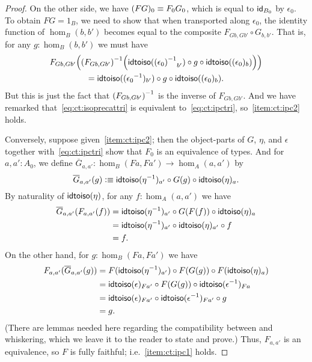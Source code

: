 \begin{proof}
  On the other side, we have $(FG)_0\jdeq F_0 G_0$, which is equal to $\idfunc[B_0]$ by $\epsilon_0$.
  To obtain $FG=1_B$, we need to show that when transported along $\epsilon_0$, the identity function of $\hom_B(b,b')$ becomes equal to the composite $F_{Gb,Gb'} \circ G_{b,b'}$.
  That is, for any $g:\hom_B(b,b')$ we must have
  \begin{multline*}
    F_{Gb,Gb'}\Big(\inv{(F_{Gb,Gb'})}\Big(\idtoiso(\opp{(\epsilon_0)}_{b'}) \circ g \circ \idtoiso((\epsilon_0)_b)\Big)\Big)\\
    = \idtoiso((\opp{\epsilon_0})_{b'}) \circ g \circ \idtoiso((\epsilon_0)_b).
  \end{multline*}
  But this is just the fact that $\inv{(F_{Gb,Gb'})}$ is the inverse of $F_{Gb,Gb'}$.
  And we have remarked that~\eqref{eq:ct:isoprecattri} is equivalent to~\eqref{eq:ct:ipctri}, so~\ref{item:ct:ipc2} holds.

  Conversely, suppose given~\ref{item:ct:ipc2}; then the object-parts of $G$, $\eta$, and $\epsilon$ together with~\eqref{eq:ct:ipctri} show that $F_0$ is an equivalence of types.
  And for $a,a':A_0$, we define $\overline{G}_{a,a'}: \hom_B(Fa,Fa') \to \hom_A(a,a')$ by
  \begin{equation}
    \overline{G}_{a,a'}(g) \defeq \idtoiso(\opp{\eta})_{a'} \circ G(g) \circ \idtoiso(\eta)_a.\label{eq:ct:gbar}
  \end{equation}
  By naturality of $\idtoiso(\eta)$, for any $f:\hom_A(a,a')$ we have
  \begin{align*}
    \overline{G}_{a,a'}(F_{a,a'}(f))
    &= \idtoiso(\opp{\eta})_{a'} \circ G(F(f)) \circ \idtoiso(\eta)_a\\
    &= \idtoiso(\opp{\eta})_{a'} \circ \idtoiso(\eta)_{a'} \circ f \\
    &= f.
  \end{align*}
  On the other hand, for $g:\hom_B(Fa,Fa')$ we have
  \begin{align*}
    F_{a,a'}(\overline{G}_{a,a'}(g))
    &= F(\idtoiso(\opp{\eta})_{a'}) \circ F(G(g)) \circ F(\idtoiso(\eta)_a)\\
    &= \idtoiso(\epsilon)_{Fa'}
    \circ F(G(g))
    \circ \idtoiso(\opp{\epsilon})_{Fa}\\
    &= \idtoiso(\epsilon)_{Fa'}
    \circ \idtoiso(\opp{\epsilon})_{Fa'}
    \circ g\\
    &= g.
  \end{align*}
  (There are lemmas needed here regarding the compatibility between \idtoiso and whiskering, which we leave it to the reader to state and prove.)
  Thus, $F_{a,a'}$ is an equivalence, so $F$ is fully faithful; i.e.~\ref{item:ct:ipc1} holds.


\end{proof}
